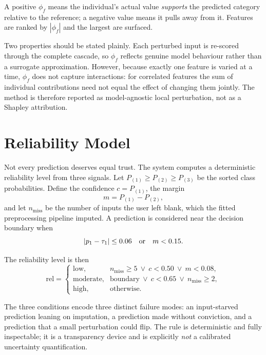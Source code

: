 A positive $\phi_f$ means the individual's actual value \emph{supports} the
predicted category relative to the reference; a negative value means it pulls
away from it. Features are ranked by $|\phi_f|$ and the largest are surfaced.

Two properties should be stated plainly. Each perturbed input is re-scored
through the complete cascade, so $\phi_f$ reflects genuine model behaviour
rather than a surrogate approximation. However, because exactly one feature is
varied at a time, $\phi_f$ does not capture interactions: for correlated
features the sum of individual contributions need not equal the effect of
changing them jointly. The method is therefore reported as model-agnostic local
perturbation, not as a Shapley attribution.

\section{Reliability Model}
\label{sec:reliability_model}

Not every prediction deserves equal trust. The system computes a deterministic
reliability level from three signals. Let $P_{(1)} \geq P_{(2)} \geq P_{(3)}$ be
the sorted class probabilities. Define the confidence $c = P_{(1)}$, the margin
\begin{equation}
m = P_{(1)} - P_{(2)},
\label{eq:margin}
\end{equation}
and let $n_{\mathrm{miss}}$ be the number of inputs the user left blank, which
the fitted preprocessing pipeline imputed. A prediction is considered near the
decision boundary when
\begin{equation}
\left|p_{1} - \tau_{1}\right| \leq 0.06 \quad\text{or}\quad m < 0.15 .
\label{eq:boundary}
\end{equation}

The reliability level is then
\begin{equation}
\mathrm{rel} =
\begin{cases}
\text{low}, & n_{\mathrm{miss}} \geq 5 \ \lor\ c < 0.50 \ \lor\ m < 0.08,\\[2pt]
\text{moderate}, & \text{boundary} \ \lor\ c < 0.65 \ \lor\ n_{\mathrm{miss}} \geq 2,\\[2pt]
\text{high}, & \text{otherwise.}
\end{cases}
\label{eq:reliability}
\end{equation}

The three conditions encode three distinct failure modes: an input-starved
prediction leaning on imputation, a prediction made without conviction, and a
prediction that a small perturbation could flip. The rule is deterministic and
fully inspectable; it is a transparency device and is explicitly \emph{not} a
calibrated uncertainty quantification.

